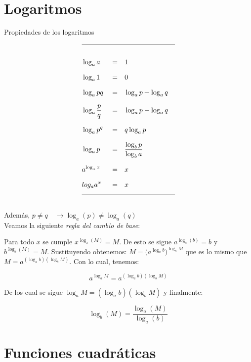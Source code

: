 \documentclass[12pt,a4paper]{extarticle}
\title{}
\begin{document}
\maketitle
\begin{center}\currfilename\end{center}
\section{Logaritmos}
\begin{table}[!htbp]
\caption{Propiedades de los logaritmos}
\begin{align*}
\hline\\[0.5em]
&\log_a{a} &&=&& 1 &\\[0.7em]
&\log_a{1} &&=&& 0 &\\[0.7em]
&\log_a{pq} &&=&& \log_a{p} + \log_a{q}&\\[0.7em]
&\log_a{\frac{p}{q}} &&=&& \log_a{p} - \log_a{q} &\\[0.7em]
&\log_a{p^q} &&=&& q\log_a{p} &\\[0.7em]
&\log_a{p} &&=&& \frac{\log_b{p}}{\log_b{a}}&\\[0.7em]
&a^{\log_a{x}} &&=&& x &\\[0.7em]
&log_a{a^x} &&=&& x &\\[0.7em]
\hline \\
\end{align*}
\label{tab:loga}
\end{table}

Adem\'as, \(p \neq q \quad \to  \log_a(p) \neq \log_a(q)\) \\

Veamos la siguiente \emph{regla del cambio de base}:

Para todo \( x \)  se cumple \( x^{\log_x(M)} = M \). De esto se sigue
\( a^{\log_a(b)} = b \) y \( b^{\log_b(M)} = M \). Sustituyendo
obtenemos: \(M= \big(a^{\log_a b}\big)^{\log_b M} \) que es lo mismo que
\(M= a^{(\log_a b)(\log_b M)}   \). Con lo cual, tenemos:


\[a^{\log_a M} = a^{(\log_a b)(\log_b M)} \]

De los cual se sigue \( \log_a M = (\log_a b)(\log_b M) \)  y
finalmente:

\begin{equation}
\log_b(M) = \frac{\log_a(M)}{\log_a(b)}
\end{equation}

\section{Funciones cuadr\'aticas}
\end{document}
